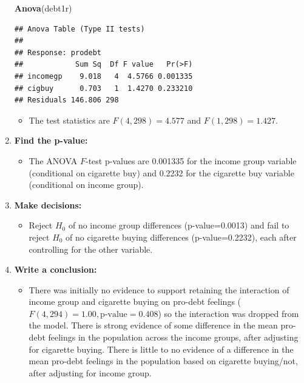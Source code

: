 \documentclass[]{book}
\newenvironment{Shaded}{\begin{snugshade}}{\end{snugshade}}
\newcommand{\KeywordTok}[1]{\textcolor[rgb]{0.13,0.29,0.53}{\textbf{#1}}}
\newcommand{\NormalTok}[1]{#1}
\providecommand{\tightlist}{%
  \setlength{\itemsep}{0pt}\setlength{\parskip}{0pt}}
\theoremstyle{definition}
\theoremstyle{definition}
\theoremstyle{remark}
\begin{document}
\begin{enumerate}
\begin{Shaded}
\begin{Highlighting}[]
\KeywordTok{Anova}\NormalTok{(debt1r)}
\end{Highlighting}
\end{Shaded}

\begin{verbatim}
## Anova Table (Type II tests)
## 
## Response: prodebt
##            Sum Sq  Df F value   Pr(>F)
## incomegp    9.018   4  4.5766 0.001335
## cigbuy      0.703   1  1.4270 0.233210
## Residuals 146.806 298
\end{verbatim}

  \begin{itemize}
  \tightlist
  \item
    The test statistics are \(F(4,298)=4.577\) and \(F(1,298)=1.427\).
  \end{itemize}
\item
  \textbf{Find the p-value:}

  \begin{itemize}
  \tightlist
  \item
    The ANOVA \(F\)-test p-values are 0.001335 for the income group
    variable (conditional on cigarette buy) and 0.2232 for the cigarette
    buy variable (conditional on income group).
  \end{itemize}
\item
  \textbf{Make decisions:}

  \begin{itemize}
  \tightlist
  \item
    Reject \(H_0\) of no income group differences (p-value=0.0013) and
    fail to reject \(H_0\) of no cigarette buying differences
    (p-value=0.2232), each after controlling for the other variable.
  \end{itemize}
\item
  \textbf{Write a conclusion:}

  \begin{itemize}
  \tightlist
  \item
    There was initially no evidence to support retaining the interaction
    of income group and cigarette buying on pro-debt feelings
    (\(F(4,294)=1.00, \text{p-value} =0.408\)) so the interaction was
    dropped from the model. There is strong evidence of some difference
    in the mean pro-debt feelings in the population across the income
    groups, after adjusting for cigarette buying. There is little to no
    evidence of a difference in the mean pro-debt feelings in the
    population based on cigarette buying/not, after adjusting for income
    group.
  \end{itemize}
\end{enumerate}
\end{document}
